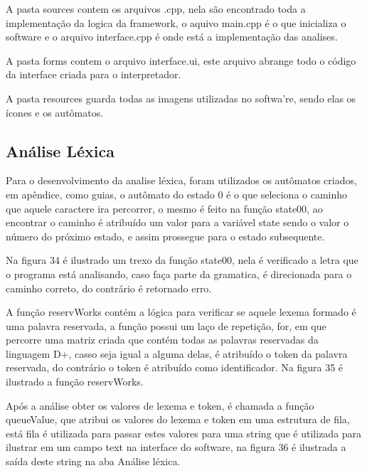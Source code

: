 \documentclass[12pt,oneside,a4paper,chapter=TITLE,section=TITLE,sumario=tradicional]{abntex2}
\begin{document}
A pasta sources contem os arquivos .cpp, nela são encontrado toda a implementação da logica da framework, o aquivo main.cpp é o que inicializa o software e o arquivo interface.cpp é onde está a implementação das analises.

A pasta forms contem o arquivo interface.ui, este arquivo abrange todo o código da interface criada para o interpretador.

A pasta resources guarda todas as imagens utilizadas no softwa're, sendo elas os ícones e os autômatos.

\subsection{Análise Léxica}
\label{subsec:analiselexica}

Para o desenvolvimento da analise léxica, foram utilizados os autômatos criados, em apêndice, como guias, o autômato do estado 0 é o que seleciona o caminho que aquele caractere ira percorrer, o mesmo é feito na função state00, ao encontrar o caminho é atribuído um valor para a variável state sendo o valor o número do próximo estado, e assim prossegue para o estado subsequente.

Na figura 34 é ilustrado um trexo da função state00, nela é verificado a letra que o programa está analisando, caso faça parte da gramatica, é direcionada para o caminho correto, do contrário é retornado erro.

\begin{figure}[htb]
\end{figure} 

A função reservWorks contém a lógica para verificar se aquele lexema formado é uma palavra reservada, a função possui um laço de repetição, for, em que percorre uma matriz criada que contém todas as palavras reservadas da linguagem D+, casso seja igual a alguma delas, é atribuído o token da palavra reservada, do contrário o token é atribuído como identificador. Na figura 35 é ilustrado a função reservWorks.

\begin{figure}[htb]
\end{figure} 

Após a análise obter os valores de lexema e token, é chamada a função queueValue, que atribui os valores do lexema e token em uma estrutura de fila, está fila é utilizada para passar estes valores para uma string que é utilizada para ilustrar em um campo text na interface do software, na figura 36	 é ilustrada a saída deste string na aba Análise léxica.
\end{document}
